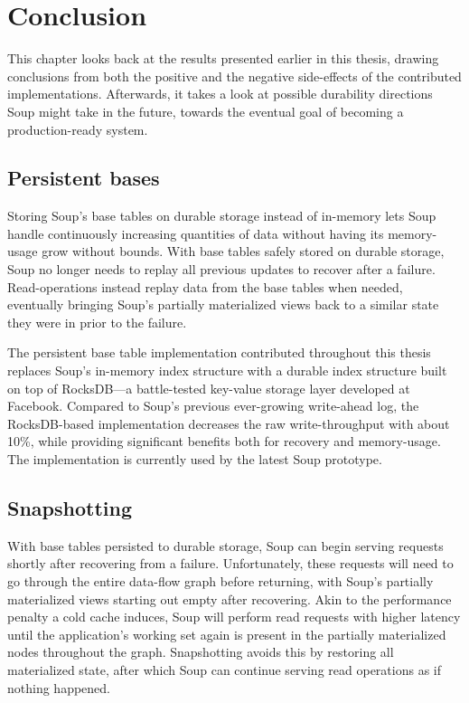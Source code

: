 \chapter{Conclusion}\label{chap:conclusion}

This chapter looks back at the results presented earlier in this thesis, drawing
conclusions from both the positive and the negative side-effects of the
contributed implementations. Afterwards, it takes a look at possible durability
directions Soup might take in the future, towards the eventual goal of becoming
a production-ready system.

\newpage

\section{Persistent bases}

Storing Soup's base tables on durable storage instead of in-memory lets Soup
handle continuously increasing quantities of data without having its
memory-usage grow without bounds. With base tables safely stored on durable
storage, Soup no longer needs to replay all previous updates to recover after a
failure. Read-operations instead replay data from the base tables when needed,
eventually bringing Soup's partially materialized views back to a similar state
they were in prior to the failure.

The persistent base table implementation contributed throughout this thesis
replaces Soup's in-memory index structure with a durable index structure built
on top of RocksDB---a battle-tested key-value storage layer developed at
Facebook. Compared to Soup's previous ever-growing write-ahead log, the
RocksDB-based implementation decreases the raw write-throughput with about 10\%,
while providing significant benefits both for recovery and memory-usage. The
implementation is currently used by the latest Soup prototype.

\section{Snapshotting}

With base tables persisted to durable storage, Soup can begin serving requests
shortly after recovering from a failure. Unfortunately, these requests will need
to go through the entire data-flow graph before returning, with Soup's partially
materialized views starting out empty after recovering. Akin to the performance
penalty a cold cache induces, Soup will perform read requests with higher
latency until the application's working set again is present in the partially
materialized nodes throughout the graph. Snapshotting avoids this by restoring
all materialized state, after which Soup can continue serving read operations as
if nothing happened.

